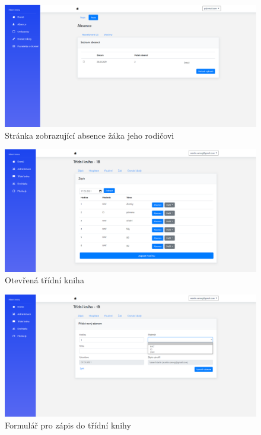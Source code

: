\begin{figure}
	\centering
	\includegraphics[width=\textwidth]{images/app_samples/rodic-absence.png}
	\caption{Stránka zobrazující absence žáka jeho rodičovi}
	\label{rodic-absence}
\end{figure}
\clearpage

\begin{figure}
	\centering
	\includegraphics[width=\textwidth]{images/app_samples/tridni-kniha-otevrena-data.png}
	\caption{Otevřená třídní kniha}
	\label{tridni-kniha-otevrena}
\end{figure}
\clearpage

\begin{figure}
	\centering
	\includegraphics[width=\textwidth]{images/app_samples/tridni-kniha-zapis.png}
	\caption{Formulář pro zápis do třídní knihy}
	\label{tridni-kniha-zapis}
\end{figure}
\clearpage

